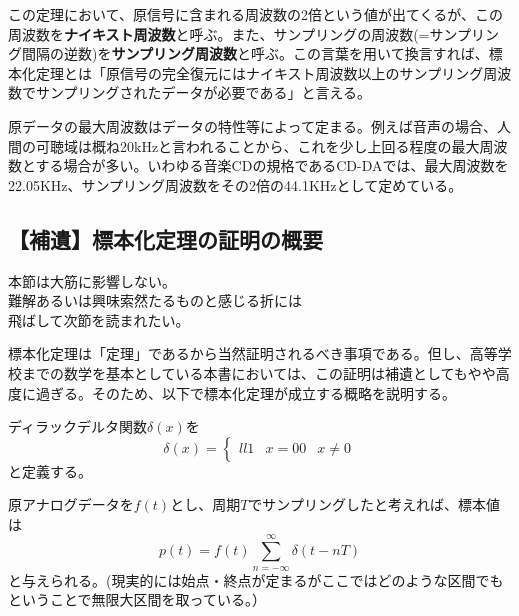 この定理において、原信号に含まれる周波数の2倍という値が出てくるが、この周波数を\textbf{ナイキスト周波数}と呼ぶ。また、サンプリングの周波数(=サンプリング間隔の逆数)を\textbf{サンプリング周波数}と呼ぶ。この言葉を用いて換言すれば、標本化定理とは「原信号の完全復元にはナイキスト周波数以上のサンプリング周波数でサンプリングされたデータが必要である」と言える。

原データの最大周波数はデータの特性等によって定まる。例えば音声の場合、人間の可聴域は概ね20kHzと言われることから、これを少し上回る程度の最大周波数とする場合が多い。いわゆる音楽CDの規格であるCD-DAでは、最大周波数を22.05KHz、サンプリング周波数をその2倍の44.1KHzとして定めている。

\subsection{【補遺】標本化定理の証明の概要}
\begin{center}
\begin{minipage}[]{0.75\linewidth}
\begin{screen}
\begin{center}
本節は大筋に影響しない。\\
難解あるいは興味索然たるものと感じる折には\\
飛ばして次節を読まれたい。
\end{center}
\end{screen}
\end{minipage}
\end{center}

標本化定理は「定理」であるから当然証明されるべき事項である。但し、高等学校までの数学を基本としている本書においては、この証明は補遺としてもやや高度に過ぎる。そのため、以下で標本化定理が成立する概略を説明する。

ディラックデルタ関数$\delta(x)$を
\begin{equation}
\delta(x)=\left\{
\begin{matrix}{ll}
1&x=0
0&x\neq 0
\end{matrix}
\right.
\end{equation}
と定義する。

原アナログデータを$f(t)$とし、周期$T$でサンプリングしたと考えれば、標本値は
\begin{equation}
p(t)=f(t)\sum^{\infty}_{n=-\infty} \delta(t-nT)
\end{equation}
と与えられる。(現実的には始点・終点が定まるがここではどのような区間でもということで無限大区間を取っている。）


